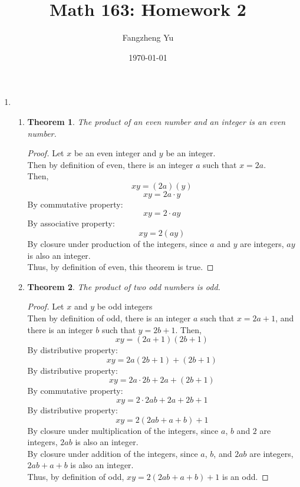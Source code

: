 \documentclass{article}
\title{Math 163: Homework 2}
\author{Fangzheng Yu}
\date{\today}
\newtheorem*{theorem*}{Theorem}
\begin{document}

	\maketitle

    \begin{enumerate}
        \item 
        \begin{enumerate}
            \item 
            \begin{theorem*}
                The product of an even number and an integer is an even number.
            \end{theorem*}
            \begin{proof}
                Let $x$ be an even integer and $y$ be an integer.\\
                Then by definition of even, there is an integer $a$ such that $x = 2a$.\\
                Then,
                \[xy = (2a)(y)\]
                \[xy = 2a \cdot y\]
                By commutative property:
                \[xy = 2 \cdot ay\]
                By associative property:
                \[xy = 2(ay)\]
                By closure under production of the integers, since $a$ and $y$ are integers, $ay$ is also an integer.\\
                Thus, by definition of even, this theorem is true.
            \end{proof}
            \item 
            \begin{theorem*}
                The product of two odd numbers is odd.
            \end{theorem*}
            \begin{proof}
                Let $x$ and $y$ be odd integers\\
                Then by definition of odd, there is an integer $a$ such that $x = 2a + 1$,
                and there is an integer $b$ such that $y = 2b + 1$.
                Then,
                \[xy = (2a + 1)(2b + 1)\]
                By distributive property:
                \[xy = 2a(2b + 1) + (2b + 1)\]
                By distributive property:
                \[xy = 2a \cdot 2b + 2a + (2b + 1)\]
                By commutative property:
                \[xy = 2 \cdot 2 ab + 2a + 2b + 1\]
                By distributive property:
                \[xy = 2(2ab + a + b) + 1\]
                By closure under multiplication of the integers, since $a$, $b$ and $2$ are integers, $2ab$ is also an integer.\\
                By closure under addition of the integers, since $a$, $b$, and $2ab$ are integers, $2ab + a + b$ is also an integer.\\
                Thus, by definition of odd, $xy = 2(2ab + a + b) + 1$ is an odd.
            \end{proof}
        \end{enumerate}


\end{enumerate}
\end{document}
